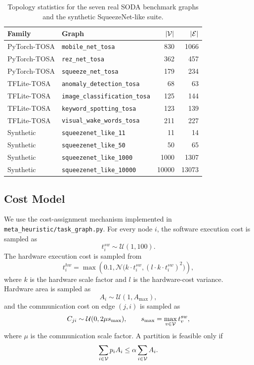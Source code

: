 \begin{table}[t]
\centering
\caption{Topology statistics for the seven real SODA benchmark graphs and the synthetic SqueezeNet-like suite.}
\label{tab:graph_stats}
\small
\begin{tabular}{llrr}
\toprule
Family & Graph & $|\mathcal{V}|$ & $|\mathcal{E}|$ \\
\midrule
PyTorch-TOSA & \texttt{mobile\_net\_tosa} & 830 & 1066 \\
PyTorch-TOSA & \texttt{rez\_net\_tosa} & 362 & 457 \\
PyTorch-TOSA & \texttt{squeeze\_net\_tosa} & 179 & 234 \\
TFLite-TOSA & \texttt{anomaly\_detection\_tosa} & 68 & 63 \\
TFLite-TOSA & \texttt{image\_classification\_tosa} & 125 & 144 \\
TFLite-TOSA & \texttt{keyword\_spotting\_tosa} & 123 & 139 \\
TFLite-TOSA & \texttt{visual\_wake\_words\_tosa} & 211 & 227 \\
Synthetic & \texttt{squeezenet\_like\_11} & 11 & 14 \\
Synthetic & \texttt{squeezenet\_like\_50} & 50 & 65 \\
Synthetic & \texttt{squeezenet\_like\_1000} & 1000 & 1307 \\
Synthetic & \texttt{squeezenet\_like\_10000} & 10000 & 13073 \\
\bottomrule
\end{tabular}
\end{table}

\subsection{Cost Model}
We use the cost-assignment mechanism implemented in \texttt{meta\_heuristic/task\_graph.py}. For every node $i$, the software execution cost is sampled as
\begin{equation}
t_i^{sw} \sim \mathcal{U}(1,100).
\end{equation}
The hardware execution cost is sampled from
\begin{equation}
t_i^{hw} = \max\!\left(0.1,\mathcal{N}\big(k \cdot t_i^{sw}, (l \cdot k \cdot t_i^{sw})^2\big)\right),
\end{equation}
where $k$ is the hardware scale factor and $l$ is the hardware-cost variance. Hardware area is sampled as
\begin{equation}
A_i \sim \mathcal{U}(1,A_{\max}),
\end{equation}
and the communication cost on edge $(j,i)$ is sampled as
\begin{equation}
C_{ji} \sim \mathcal{U}(0,2\mu s_{\max}),
\qquad
s_{\max}=\max_{v\in\mathcal{V}} t_v^{sw},
\end{equation}
where $\mu$ is the communication scale factor. A partition is feasible only if
\begin{equation}
\sum_{i\in\mathcal{V}} p_i A_i \le \alpha \sum_{i\in\mathcal{V}} A_i.
\end{equation}

